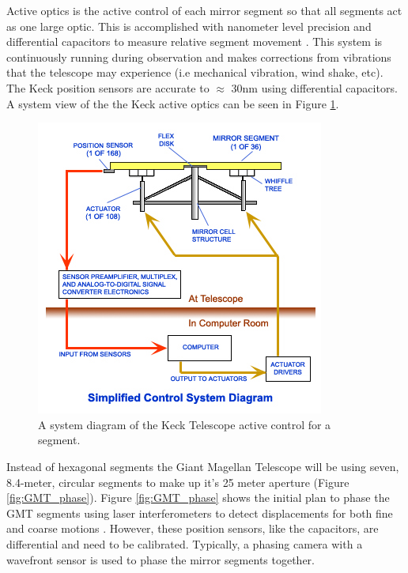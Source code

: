 Active optics is the active control of each mirror segment so that all segments act as one large optic.  This is accomplished with nanometer level precision and differential capacitors to measure relative segment movement \cite{Nelson1990titleConstructionObservatory/title}.  This system is continuously running during observation and makes corrections from vibrations that the telescope may experience (i.e mechanical vibration, wind shake, etc).  The Keck position sensors are accurate to $\approx$ 30nm using differential capacitors.  A system view of the the Keck active optics can be seen in Figure \ref{fig:active_control}.


\begin{figure}[H]
\centering
\includegraphics[width=8 cm]{../Figures/KCompDiag}
\caption{A system diagram of the Keck Telescope active control for a segment.}
\label{fig:active_control}
\end{figure}

Instead of hexagonal segments the Giant Magellan Telescope will be using seven, 8.4-meter, circular segments to make up it's 25 meter aperture (Figure \ref{fig:GMT_phase}).  Figure \ref{fig:GMT_phase} shows the initial plan to phase the GMT segments using laser interferometers to detect displacements for both fine and coarse motions \cite{Acton2012PhasingGMT}.  However, these position sensors, like the capacitors, are differential and need to be calibrated.  Typically, a phasing camera with a wavefront sensor is used to phase the mirror segments together.


